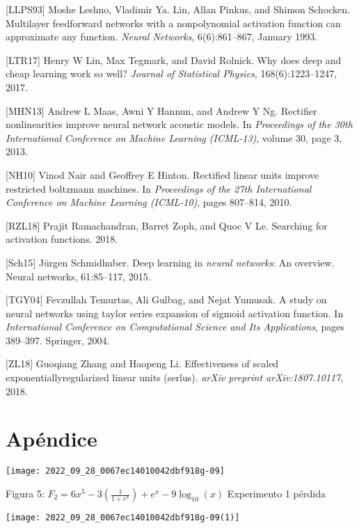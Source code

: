 \documentclass[10pt]{article}
\begin{document}
[LLPS93] Moshe Leshno, Vladimir Ya. Lin, Allan Pinkus, and Shimon Schocken. Multilayer
feedforward networks with a nonpolynomial activation function can approximate
any function. \emph{Neural Networks}, 6(6):861–867, January 1993.
\newline

[LTR17] Henry W Lin, Max Tegmark, and David Rolnick. Why does deep and cheap learning work so well? \emph{Journal of Statistical Physics}, 168(6):1223–1247, 2017.
\newline

[MHN13] Andrew L Maas, Awni Y Hannun, and Andrew Y Ng. Rectifier nonlinearities improve neural network acoustic models. In \emph{Proceedings of the 30th International Conference on Machine Learning (ICML-13)}, volume 30, page 3, 2013.
\newline

[NH10] Vinod Nair and Geoffrey E Hinton. Rectified linear units improve restricted boltzmann machines. In \emph{Proceedings of the 27th International Conference on Machine Learning (ICML-10)}, pages 807–814, 2010.
\newline

[RZL18] Prajit Ramachandran, Barret Zoph, and Quoc V Le. Searching for activation functions. 2018.
\newline

[Sch15] Jürgen Schmidhuber. Deep learning in \emph{neural networks}: An overview. Neural
networks, 61:85–117, 2015.
\newline

[TGY04] Fevzullah Temurtas, Ali Gulbag, and Nejat Yumusak. A study on neural networks
using taylor series expansion of sigmoid activation function. In \emph{International Conference on Computational Science and Its Applications}, pages 389–397. Springer, 2004.
\newline

[ZL18] Guoqiang Zhang and Haopeng Li. Effectiveness of scaled exponentiallyregularized linear units (serlus). \emph{arXiv preprint arXiv:1807.10117}, 2018.

\section{Apéndice}
\texttt{[image: 2022\_09\_28\_0067ec14010042dbf918g-09]}

Figura 5: $F_{2}=6 x^{5}-3\left(\frac{1}{1+e^{x}}\right)+e^{x}-9 \log _{10}(x)$ Experimento 1 pérdida

\texttt{[image: 2022\_09\_28\_0067ec14010042dbf918g-09(1)]}
\end{document}
